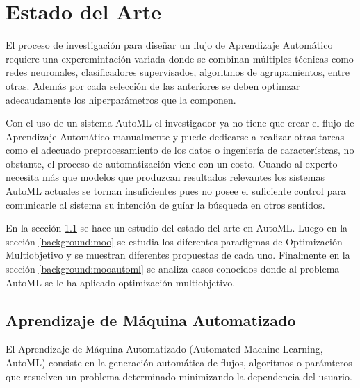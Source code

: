 \chapter{Estado del Arte}\label{chapter:state-of-the-art}
El proceso de investigaci\'on para dise\~nar un flujo de Aprendizaje Autom\'atico requiere una experemintaci\'on variada donde se combinan m\'ultiples t\'ecnicas como redes neuronales, clasificadores supervisados, algoritmos de agrupamientos, entre otras. Adem\'as por cada selecci\'on de las anteriores se deben optimzar adecaudamente los hiperpar\'ametros que la componen.

Con el uso de un sistema AutoML el investigador ya no tiene que crear el flujo de Aprendizaje Autom\'atico manualmente y puede dedicarse a realizar otras tareas como el adecuado preprocesamiento de los datos o ingenier\'ia de caracter\'istcas, no obstante, el proceso de automatizaci\'on viene con un costo. Cuando al experto necesita m\'as que modelos que produzcan resultados relevantes los sistemas AutoML actuales se tornan insuficientes pues no posee el suficiente control para comunicarle al sistema su intenci\'on de gu\'iar la b\'usqueda en otros sentidos.

En la secci\'on \ref{background:automl} se  hace un estudio del estado del arte en AutoML. Luego en la secci\'on \ref{background:moo} se estudia los diferentes paradigmas de Optimizaci\'on Multiobjetivo y se muestran diferentes propuestas de cada uno. Finalmente en la secci\'on \ref{background:mooautoml} se analiza casos conocidos donde al problema AutoML se le ha aplicado optimizaci\'on multiobjetivo.

\section{Aprendizaje de M\'aquina Automatizado}\label{background:automl}
El Aprendizaje de M\'aquina Automatizado (Automated Machine Learning, AutoML) consiste en la generaci\'on autom\'atica de flujos, algoritmos o par\'amteros que resuelven un problema determinado minimizando la dependencia del usuario. 

